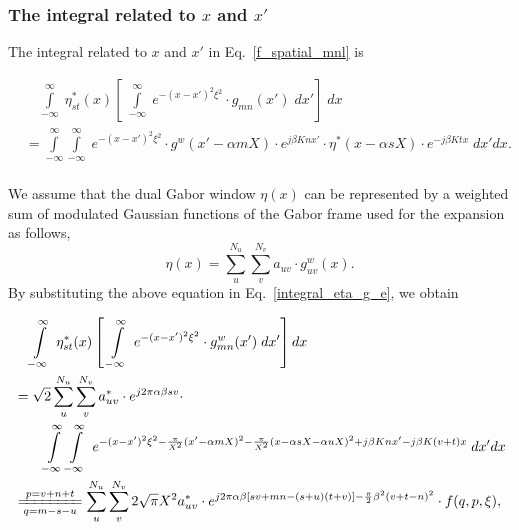 \documentclass[preprint,12pt]{elsarticle}
\begin{document}
\subsubsection{The integral related to $x$ and $x'$}
\label{integral_x_spatial}
The integral related to  $x$ and $x'$ in Eq.~\eqref{f_spatial_mnl} is 
\begin{small}
\begin{equation}
\begin{split}
& \quad  \int \limits^{\infty}_{-\infty} \; \eta^*_{st}(x) \left[ \; \int \limits^{\infty}_{-\infty} \; e^{-(x-x')^2\xi^2} \cdot g_{mn}(x') \; dx'\right] \; dx \\
&=  \int \limits^{\infty}_{-\infty} \int \limits^{\infty}_{-\infty}  \; e^{-(x-x')^2\xi^2} \cdot {g^w}(x' - \alpha mX) \cdot e^{j\beta K n x'} \cdot \eta^* (x - \alpha s X) \cdot e^{-j\beta K t x} \; dx'dx .\\
\end{split}
\label{integral_eta_g_e}
\end{equation}
\end{small}
We assume that the dual Gabor window $\eta(x)$ can be represented by a weighted sum of modulated Gaussian functions of the Gabor frame used for the expansion as follows,
\begin{equation}
\eta (x) = \sum^{N_u}_{u} \sum^{N_v}_{v} a_{u v}\cdot {g^w_{uv}}(x).
\end{equation}
By substituting the above equation in Eq.~\eqref{integral_eta_g_e}, we obtain
\begin{small}
\begin{equation}
\begin{split}
& \quad  \int \limits^{\infty}_{-\infty} \; \eta^*_{st}(x) \left[ \;  \int \limits^{\infty}_{-\infty} \; e^{-(x-x')^2\xi^2} \cdot {g^w_{mn}}(x') \; dx'\right]dx \\
&=\sqrt{2}\sum^{N_{u}}_{u} \sum^{N_{v}}_{v} a^*_{u v} \cdot e^{j2\pi\alpha \beta s v} \cdot  \\
&\qquad \int \limits^{\infty}_{-\infty} \int \limits^{\infty}_{-\infty} \; e^{-(x-x')^2\xi^2 - \frac{\pi}{X^2} (x' - \alpha m X)^2 - \frac{\pi}{X^2}(x - \alpha s X - \alpha u X)^2 + j\beta K n x' -j\beta K (v + t) x } \; dx'  dx\\
&\xlongequal[q = m-s-u]{p = v + n + t}\sum^{N_{u}}_{u} \sum^{N_{v}}_{v}2\sqrt{\pi}X^2 a^*_{u v} \cdot e^{j2\pi\alpha \beta [s v + mn - (s+u)(t+v)] - \frac{\pi}{2}\beta^2(v + t -n)^2} \cdot f(q,p,\xi),
\end{split}
\end{equation}
\end{small}
\end{document}
